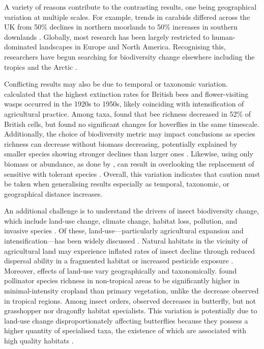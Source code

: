 \documentclass[11pt]{article}
\begin{document}
		\noindent A variety of reasons contribute to the contrasting results, one being geographical variation at multiple scales. For example, trends in carabids differed across the UK from 50\% declines in northern moorlands to 50\% increases in southern downlands \citep{brooks2012large}. Globally, most research has been largely restricted to human-dominated landscapes in Europe and North America. Recognising this, researchers have begun searching for biodiversity change elsewhere including the tropics \citep{lister2018climate,wagner2021insect} and the Arctic \citep{loboda2018declining,gillespie2020status}.    
		
		\noindent Conflicting results may also be due to temporal or taxonomic variation. \citet{ollerton2014extinctions} calculated that the highest extinction rates for British bees and flower-visiting wasps occurred in the 1920s to 1950s, likely coinciding with intensification of agricultural practice. Among taxa, \citet{biesmeijer2006parallel} found that bee richness decreased in 52\% of British cells, but found no significant changes for hoverflies in the same timescale. Additionally, the choice of biodiversity metric may impact conclusions as species richness can decrease without biomass decreasing, potentially explained by smaller species showing stronger declines than larger ones \citep{homburg2019have}. Likewise, using only biomass or abundance, as done by \citet{van2020meta}, can result in overlooking the replacement of sensitive with tolerant species \citep{jahnig2021revisiting}. Overall, this variation indicates that caution must be taken when generalising results especially as temporal, taxonomic, or geographical distance increases.   
		
		\noindent An additional challenge is to understand the drivers of insect biodiversity change, which include land-use change, climate change, habitat loss, pollution, and invasive species \citep{cardoso2020scientists}. Of these, land-use—particularly agricultural expansion and intensification—has been widely discussed \citep{newbold2014global,newbold2016global,newbold2018widespread,seibold2019arthropod,gillespie2022landscape}. Natural habitats in the vicinity of agricultural land may experience inflated rates of insect decline through reduced dispersal ability in a fragmented habitat or increased pesticide exposure \citep{seibold2019arthropod}. Moreover, effects of land-use vary geographically and taxonomically. \citet{millard2021global} found pollinator species richness in non-tropical areas to be significantly higher in minimal-intensity cropland than primary vegetation, unlike the decrease observed in tropical regions. Among insect orders, \citet{engelhardt2022consistent} observed decreases in butterfly, but not grasshopper nor dragonfly habitat specialists. This variation is potentially due to land-use change disproportionately affecting butterflies because they possess a higher quantity of specialised taxa, the existence of which are associated with high quality habitats \citep{poniatowski2018patch}. 
		
\end{document}
